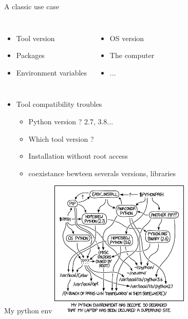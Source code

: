 \begin{frame}{A classic use case}
\begin{columns}
\begin{itemize}
	\item Tool version
	\item Packages
	\item Environment variables
\end{itemize}
\begin{itemize}
	\item OS version
	\item The computer 
	\item ...
\end{itemize}
\end{columns}
\end{frame}

\begin{frame}
\begin{itemize}
\item Tool compatibility troubles
	\begin{itemize}
	\item Python version ? 2.7, 3.8...
	\item Which tool version ?
	\item Installation without root access
	\item coexistance bewteen severals versions, libraries
	\end{itemize}
\end{itemize}
\end{frame}

\begin{frame}{My python env}
\centering\includegraphics[width=0.5\textwidth]{images/python_environment.png} 
\end{frame}


